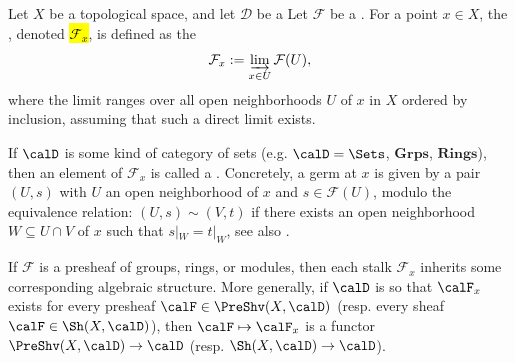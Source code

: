 
\begin{definition} \label{definition:stalk_of_a_presheaf_on_a_topological_space_at_a_point}
    Let $X$ be a topological space, and let $\mathcal{D}$ be a 
    Let $\mathcal{F}$ be a .  
    For a point $x \in X$, the , denoted \hl{$\mathcal{F}_x$}, is defined as the 
    $$\mathcal{F}_x := \varinjlim_{x \in U} \mathcal{F}(U),$$
    where the limit ranges over all open neighborhoods $U$ of $x$ in $X$ ordered by inclusion, assuming that such a direct limit exists. 

    If $\calD$ is some kind of category of sets (e.g. $\calD = \Sets$, $\mathbf{Grps}$, $\mathbf{Rings}$), then an element of $\mathcal{F}_x$ is called a . Concretely, a germ at $x$ is given by a pair $(U,s)$ with $U$ an open neighborhood of $x$ and $s \in \mathcal{F}(U)$, modulo the equivalence relation: $(U,s) \sim (V,t)$ if there exists an open neighborhood $W \subseteq U \cap V$ of $x$ such that $s|_W = t|_W$, see also .

    If $\mathcal{F}$ is a presheaf of groups, rings, or modules, then each stalk $\mathcal{F}_x$ inherits some corresponding algebraic structure. More generally, if $\calD$ is so that $\calF_x$ exists for every presheaf $\calF \in \PreShv(X, \calD)$ (resp. every sheaf $\calF \in \Sh(X, \calD)$), then $\calF \mapsto \calF_x$ is a functor $\PreShv(X, \calD) \to \calD$ (resp. $\Sh(X, \calD) \to \calD$).

\end{definition}
